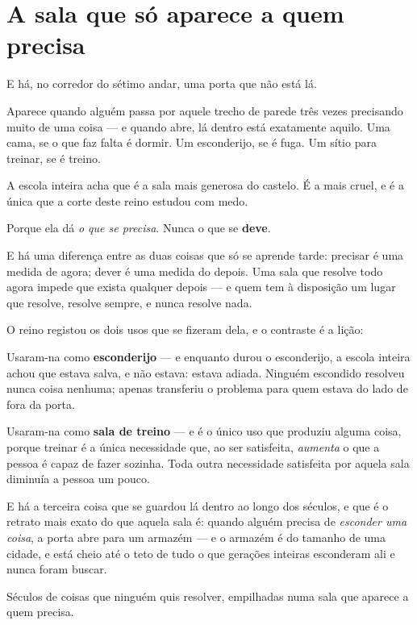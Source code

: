 \documentclass[livro.tex]{subfiles}
\begin{document}
\chapter{A sala que só aparece a quem precisa}

E há, no corredor do sétimo andar, uma porta que não está lá.

Aparece quando alguém passa por aquele trecho de parede três vezes precisando muito de uma
coisa --- e quando abre, lá dentro está exatamente aquilo. Uma cama, se o que faz falta é
dormir. Um esconderijo, se é fuga. Um sítio para treinar, se é treino.

A escola inteira acha que é a sala mais generosa do castelo. É a mais cruel, e é a única
que a corte deste reino estudou com medo.

\medskip

Porque ela dá \emph{o que se precisa}. Nunca o que se \textbf{deve}.

E há uma diferença entre as duas coisas que só se aprende tarde: precisar é uma medida de
agora; dever é uma medida do depois. Uma sala que resolve todo agora impede que exista
qualquer depois --- e quem tem à disposição um lugar que resolve, resolve sempre, e nunca
resolve nada.

\medskip

O reino registou os dois usos que se fizeram dela, e o contraste é a lição:

Usaram-na como \textbf{esconderijo} --- e enquanto durou o esconderijo, a escola inteira
achou que estava salva, e não estava: estava adiada. Ninguém escondido resolveu nunca
coisa nenhuma; apenas transferiu o problema para quem estava do lado de fora da porta.

Usaram-na como \textbf{sala de treino} --- e é o único uso que produziu alguma coisa,
porque treinar é a única necessidade que, ao ser satisfeita, \emph{aumenta} o que a
pessoa é capaz de fazer sozinha. Toda outra necessidade satisfeita por aquela sala
diminuía a pessoa um pouco.

\medskip

E há a terceira coisa que se guardou lá dentro ao longo dos séculos, e que é o retrato
mais exato do que aquela sala é: quando alguém precisa de \emph{esconder uma coisa}, a
porta abre para um armazém --- e o armazém é do tamanho de uma cidade, e está cheio até o
teto de tudo o que gerações inteiras esconderam ali e nunca foram buscar.

Séculos de coisas que ninguém quis resolver, empilhadas numa sala que aparece a quem
precisa.
\end{document}
